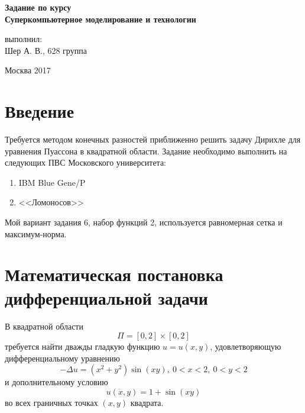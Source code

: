 \documentclass[12pt,notitlepage,oneside]{extarticle}
\begin{document}
\thispagestyle{empty}
  \begin{center}
  \large
   {\bfseries{Задание по курсу \\ Суперкомпьютерное моделирование и технологии }}
 \end{center}

\par

\par
\large
 \noindent


\par

\par
 \noindent

\vskip 6cm
   \begin{flushright}
   выполнил: \\
   Шер А. В., 628 группа
  \end{flushright}

\begin{center}
  \large  Москва 2017
\end{center}
\newpage

\section{Введение}
Требуется методом конечных разностей приближенно решить задачу Дирихле для
уравнения Пуассона в квадратной области. Задание необходимо выполнить на
следующих ПВС Московского университета:
\begin{enumerate}
\item IBM Blue Gene/P
\item <<Ломоносов>>
\end{enumerate}

Мой вариант задания 6, набор функций 2, используется равномерная сетка и
максимум-норма.

\section{Математическая постановка дифференциальной задачи}
В квадратной области
\[
  \Pi = [0, 2] \times [0, 2]
\]
требуется найти дважды гладкую функцию $u = u(x, y)$, удовлетворяющую
дифференциальному уравнению
\[
  -\Delta u = (x^2 + y^2) \sin(xy),\  0 < x < 2,\  0 < y < 2
\]
и дополнительному условию
\[
  u(x, y) = 1 + \sin(xy)
\]
во всех граничных точках $(x, y)$ квадрата.
\end{document}
